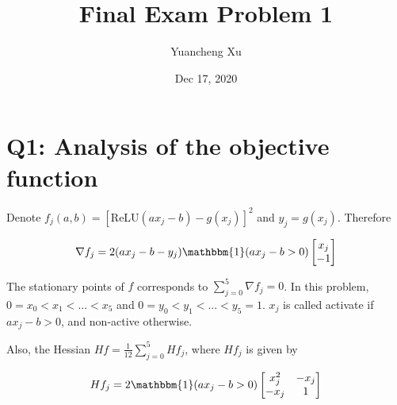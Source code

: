 \documentclass{article}
\title{Final Exam Problem 1 }
\author{Yuancheng Xu}
\date{Dec 17, 2020}
\newcommand{\ReLU}{\text{ReLU}}
\begin{document}
\maketitle


\section*{Q1: Analysis of the objective function}
Denote $ f_j(a,b) = [\ReLU(ax_j-b)-g(x_j)]^2 $ and $ y_j = g(x_j) $. Therefore 

\begin{equation} \label{eq: grad fj}
	\nabla f_j = 2(ax_j-b-y_j) \mathbbm{1}(ax_j-b>0) 
	\begin{bmatrix}
		x_j \\ -1
	\end{bmatrix}
\end{equation}

The stationary points of $ f $ corresponds to $ \sum_{j=0}^{5}\nabla f_j = 0 $. In this problem, $ 0 = x_0 < x_1 <...<x_5 $ and $ 0=y_0<y_1<...<y_5 = 1$. $ x_j $ is called activate if $ ax_j -b >0 $, and non-active otherwise.

Also, the Hessian $ Hf = \frac{1}{12}\sum_{j=0}^{5}Hf_j $, where $ Hf_j $ is given by

\begin{equation}
	Hf_j = 2 \mathbbm{1}(ax_j-b>0) 
	\begin{bmatrix}
		x_j^2 & -x_j \\ -x_j & 1
	\end{bmatrix}
\end{equation}
\end{document}
